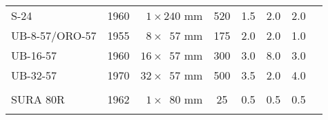 \begin{twocolumntablefloat}
\begin{twocolumntable}
\begin{tabular}{lrcccccl}
S-24            &1960&$\phantom{0}1 \times \phantom{}240$ mm&\phantom{0}520&1.5&2.0&2.0\\
\addlinespace
UB-8-57/ORO-57  &1955&$\phantom{0}8 \times \phantom{0}57$ mm&\phantom{0}175&2.0&2.0&1.0\\
UB-16-57        &1960&$\phantom{}16 \times \phantom{0}57$ mm&\phantom{0}300&3.0&8.0&3.0\\
UB-32-57        &1970&$\phantom{}32 \times \phantom{0}57$ mm&\phantom{0}500&3.5&2.0&4.0\\
\addlinespace
\midrule
\multicolumn{7}{c}{Spanish Rockets}\\
\midrule
\addlinespace
SURA 80R        &1962&$\phantom{0}1 \times \phantom{0}80$ mm&\phantom{00}25&0.5&0.5&0.5\\
\addlinespace
\bottomrule
\end{tabular}
\end{twocolumntable}
\end{twocolumntablefloat}